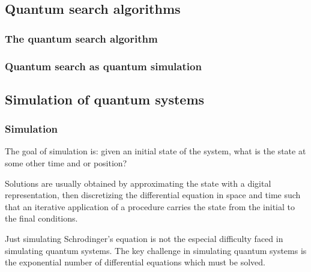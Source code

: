 \documentclass{article}
\begin{document}
\subsection{Quantum search algorithms}


\subsubsection{The quantum search algorithm}


\subsubsection{Quantum search as quantum simulation}







\subsection{Simulation of quantum systems}

\subsubsection{Simulation}
The goal of simulation is: given an initial state of the system, what is the state at some other time and or position?

Solutions are usually obtained by approximating the state with a digital representation, then discretizing the differential equation in space and time such that an
iterative application of a procedure carries the state from the initial to the final conditions.

Just simulating Schrodinger's equation is not the especial difficulty faced in simulating quantum systems. The key challenge in simulating quantum systems is the exponential number of differential equations which must be solved.
\end{document}
